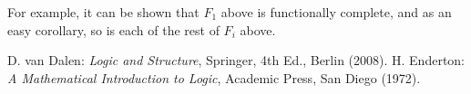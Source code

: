 \documentclass[12pt]{article}
\begin{document}
For example, it can be shown that $F_1$ above is functionally complete, and as an easy corollary, so is each of the rest of $F_i$ above.

\begin{thebibliography}{7}
 D. van Dalen: {\em Logic and Structure}, Springer, 4th Ed., Berlin (2008).
 H. Enderton: {\em A Mathematical Introduction to Logic}, Academic Press, San Diego (1972).
\end{thebibliography}
\end{document}
